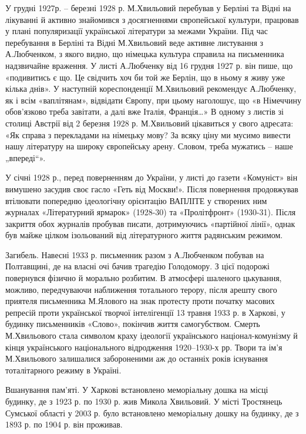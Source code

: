 У грудні 1927р. – березні 1928 р. М.Хвильовий перебував у Берліні та Відні на
лікуванні й активно знайомився з досягненнями європейської культури, працював у
плані популяризації української літератури за межами України. Під час
перебування в Берліні та Відні М.Хвильовий веде активне листування з
А.Любченком, з якого видно, що німецька культура справила на письменника
надзвичайне враження. У листі А.Любченку від 16 грудня 1927 р. він пише, що
«подивитись є що. Це свідчить хоч би той же Берлін, що в ньому я живу уже
кілька днів». У наступній кореспонденції М.Хвильовий рекомендує А.Любченку, як
і всім «ваплітянам», відвідати Європу, при цьому наголошує, що «в Німеччину
обов'язково треба завітати, а далі вже Італія, Франція…» В одному з листів зі
столиці Австрії від 2 березня 1928 р. М.Хвильовий цікавиться у свого адресата:
«Як справа з перекладами на німецьку мову? За всяку ціну ми мусимо вивести нашу
літературу на широку європейську арену. Словом, треба мужатись – наше
„впереді“».

У січні 1928 р., перед поверненням до України, у листі до газети «Комуніст» він
вимушено засудив своє гасло «Геть від Москви!». Після повернення продовжував
втілювати попередню ідеологічну орієнтацію ВАПЛІТЕ у створених ним журналах
«Літературний ярмарок» (1928-30) та «Пролітфронт» (1930-31). Після закриття
обох журналів пробував писати, дотримуючись «партійної лінії», однак був майже
цілком ізольований від літературного життя радянським режимом.

Загибель. Навесні 1933 р. письменник разом з А.Любченком побував на Полтавщині,
де на власні очі бачив трагедію Голодомору. З цієї подорожі повернувся фізично
й морально розбитим. В атмосфері шаленого цькування, можливо, передчуваючи
наближення тотального терору, після арешту свого приятеля письменника М.Ялового
на знак протесту проти початку масових репресій проти української творчої
інтелігенції 13 травня 1933 р. в Харкові, у будинку письменників «Слово»,
покінчив життя самогубством. Смерть М.Хвильового стала символом краху ідеології
українського націонал-комунізму й кінця українського національного відродження
1920–1930-х рр. Твори та ім'я М.Хвильового залишалися забороненими аж до
останніх років існування тоталітарного режиму в Україні.

Вшанування пам'яті. У Харкові встановлено меморіальну дошка на місці будинку,
де з 1923 р. по 1930 р. жив Микола Хвильовий.  У місті Тростянець Сумської
області у 2003 р. було встановлено меморіальну дошку на будинку, де з 1893 р.
по 1904 р. він проживав.

